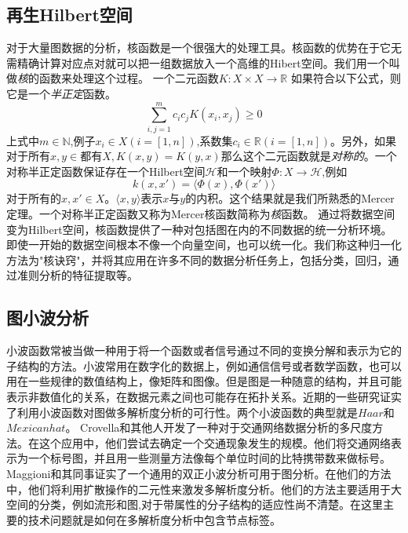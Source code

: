 \documentclass{article}
\begin{document}
\subsection{再生Hilbert空间}
对于大量图数据的分析，核函数是一个很强大的处理工具。核函数的优势在于它无需精确计算对应点对就可以把一组数据放入一个高维的Hibert空间。我们用一个叫做\emph{核}的函数来处理这个过程。
一个二元函数$K:X\times X\rightarrow \mathbb{R}$ 如果符合以下公式，则它是一个\emph{半正定}函数。
\begin{equation}
    \sum_{i,j=1}^{m}c_i c_j K(x_i ,x_j )\geq 0
\end{equation}
上式中$m\in \mathbb{N}$,例子$x_i \in X(i=[1,n])$,系数集$c_i \in \mathbb{R}(i=[1,n])$。另外，如果$对于所有x,y\in 都有X,K(x,y)=K(y,x)$那么这个二元函数就是\emph{对称的}。一个对称半正定函数保证存在一个Hilbert空间$\mathcal{H}$和一个映射$\Phi:X\rightarrow \mathcal{H} $,例如
\begin{equation}
    k(x,x')=\langle\Phi(x),\Phi(x')\rangle
\end{equation}
对于所有的$x,x'\in X $。$\langle x,y\rangle$表示$x$与$y$的内积。这个结果就是我们所熟悉的Mercer定理。一个对称半正定函数又称为Mercer核函数简称为\emph{核}函数。
通过将数据空间变为Hilbert空间，核函数提供了一种对包括图在内的不同数据的统一分析环境。即使一开始的数据空间根本不像一个向量空间，也可以统一化。我们称这种归一化方法为"核诀窍"，并将其应用在许多不同的数据分析任务上，包括分类，回归，通过准则分析的特征提取等。
\subsection{图小波分析}
小波函数常被当做一种用于将一个函数或者信号通过不同的变换分解和表示为它的子结构的方法。小波常用在数字化的数据上，例如通信信号或者数学函数，也可以用在一些规律的数值结构上，像矩阵和图像。但是图是一种随意的结构，并且可能表示非数值化的关系，在数据元素之间也可能存在拓扑关系。近期的一些研究证实了利用小波函数对图做多解析度分析的可行性。两个小波函数的典型就是$Haar$和$Mexican hat$。
Crovella和其他人开发了一种对于交通网络数据分析的多尺度方法。在这个应用中，他们尝试去确定一个交通现象发生的规模。他们将交通网络表示为一个标号图，并且用一些测量方法像每个单位时间的比特携带数来做标号。
Maggioni和其同事证实了一个通用的双正小波分析可用于图分析。在他们的方法中，他们将利用扩散操作的二元性来激发多解析度分析。他们的方法主要适用于大空间的分类，例如流形和图,对于带属性的分子结构的适应性尚不清楚。在这里主要的技术问题就是如何在多解析度分析中包含节点标签。


\ifx\allfiles\undefined
%
%
\end{document}
